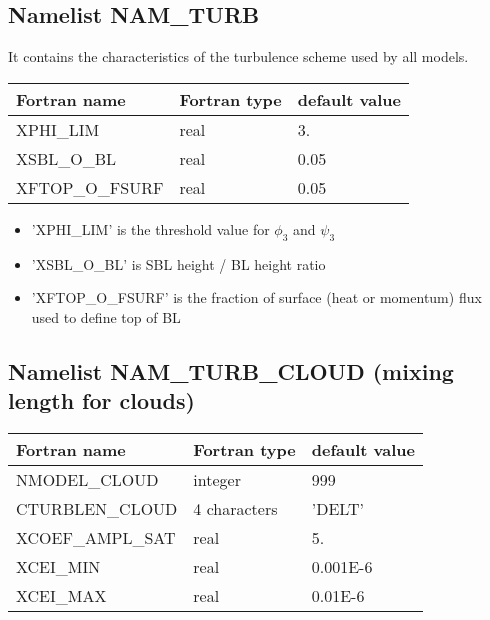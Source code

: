 \subsection{Namelist NAM\_TURB}
It contains the characteristics of the turbulence scheme used by all models.
\begin{longtable} {|p{}|p{}|p{}|}
\hline
Fortran name &  Fortran type & default value \\
\hline 
\endhead
\hline
\endfoot
 XPHI\_LIM        & real        & 3.     \\
 XSBL\_O\_BL      & real        & 0.05   \\
 XFTOP\_O\_FSURF  & real        & 0.05   \\
\end{longtable}

\begin{itemize}
\item 'XPHI\_LIM' is the threshold value for $\phi _{3}$ and $\psi _{3}$
\item 'XSBL\_O\_BL' is SBL height / BL height ratio
\item 'XFTOP\_O\_FSURF' is the fraction of surface (heat or momentum) flux used to define top of BL
\end{itemize}
\subsection{Namelist NAM\_TURB\_CLOUD (mixing length for clouds)}
\begin{longtable} {|p{}|p{}|p{}|}
\hline
Fortran name &  Fortran type & default value \\
\hline 
\endhead
\hline
\endfoot
 NMODEL\_CLOUD & integer       & 999           \\
 CTURBLEN\_CLOUD & 4 characters       & 'DELT'   \\
 XCOEF\_AMPL\_SAT& real        & 5.   \\
 XCEI\_MIN       & real        & 0.001E-6   \\
 XCEI\_MAX       & real        & 0.01E-6    \\
\end{longtable}


